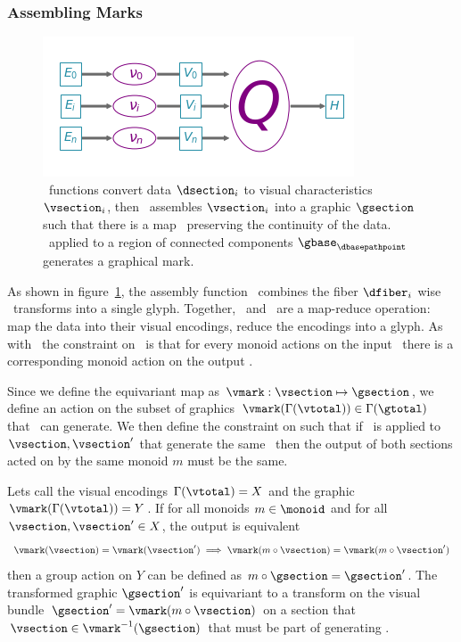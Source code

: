 \documentclass[../main.tex]{subfiles}
\begin{document}
\subsubsection{Assembling Marks}
\label{sec:artist_q}
\begin{figure}[H]
    \includegraphics[width=\textwidth]{figures/math/path_of_q}
    \caption{\vchannel\ functions convert data $\dsection_i$ to visual characteristics $\vsection_i$, then \vmark\ assembles $\vsection_i$ into a graphic $\gsection$ such that there is a map \vindex\ preserving the continuity of the data. \gsection\ applied to a region of connected components $\gbase_{\dbasepathpoint}$  generates a graphical mark.} 
    \label{fig:artist_q}
\end{figure}

As shown in figure~\ref{fig:artist_q}, the assembly function \vmark\ combines the fiber $\dfiber_i$ wise \vchannel\ transforms into a single glyph. Together, \vchannel\ and \vmark\ are a map-reduce operation: map the data into their visual encodings, reduce the encodings into a glyph. As with \vchannel\, the constraint on \vmark\ is that for every monoid actions on the input \vsection\ there is a corresponding monoid action on the output \gsection. 

Since we define the equivariant map as  $\vmark: \vsection \mapsto \gsection$, we define an action on the subset of graphics $\vmark(\Gamma(\vtotal)) \in \Gamma(\gtotal)$ that \vmark\ can generate. We then define the constraint on \vmark such that if \vmark\ is applied to $\vsection, \vsection^{\prime}$ that generate the same \gsection\, then the output of both sections acted on by the same monoid $m$ must be the same.   

Lets call the visual encodings $\Gamma(\vtotal)=X$ and the graphic $\vmark(\Gamma(\vtotal))=Y$. If for all monoids $m \in \monoid$ and for all $\vsection, \vsection^{\prime} \in X$, the output is equivalent 
\begin{equation}
\vmark(\vsection) = \vmark(\vsection^{\prime})\implies \vmark(m\circ\vsection) = \vmark(m\circ\vsection^{\prime})
\end{equation}
then a group action on $Y$ can be defined as $m\circ \gsection = \gsection^{\prime}$. The transformed graphic $\gsection^{\prime}$ is equivariant to a transform on the visual bundle $\gsection^{\prime}=\vmark(m\circ \vsection)$ on a section that $\vsection \in \vmark^{-1}(\gsection)$ that must be part of generating \gsection. 
\end{document}
